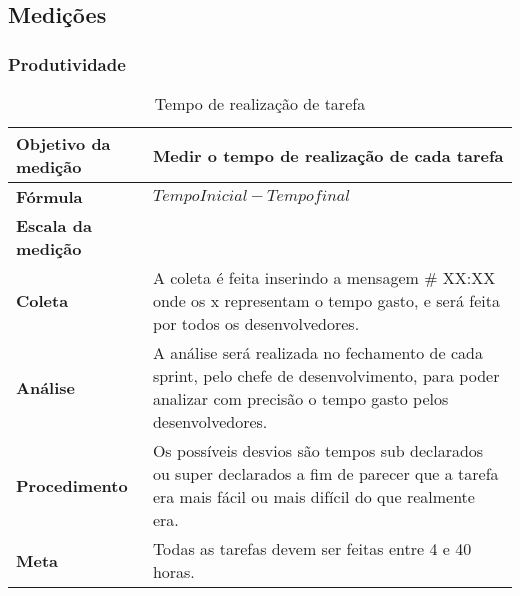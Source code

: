 \subsection{Medições}

\subsubsection{Produtividade}

\begin{table}[H]
\centering
\begin{tabular}{|p{4cm}|p{5cm}|}
\hline
	\textbf{Objetivo da medição} &
	Medir o tempo de realização de cada tarefa
	\\ \hline
	\textbf{Fórmula} &
	$Tempo Inicial - Tempo final$
	\\ \hline
	\textbf{Escala da medição} &

	\\ \hline
	\textbf{Coleta} &
	A coleta é feita inserindo a mensagem \#<numero da issue> XX:XX onde os x representam o tempo gasto, e será feita por todos os desenvolvedores.
	\\ \hline
	\textbf{Análise} &
	A análise será realizada no fechamento de cada sprint, pelo chefe de desenvolvimento, para poder analizar com precisão o tempo gasto pelos desenvolvedores.
	\\ \hline
	\textbf{Procedimento} &
	Os possíveis desvios são tempos sub declarados ou super declarados a fim de parecer que a tarefa era mais fácil ou mais difícil do que realmente era.
	\\ \hline
  \textbf{Meta} &
	Todas as tarefas devem ser feitas entre 4 e 40 horas.
  \\ \hline
\end{tabular}
\caption{Tempo de realização de tarefa}
\label{tab:tempo_realizacao_tarefa}
\end{table}


